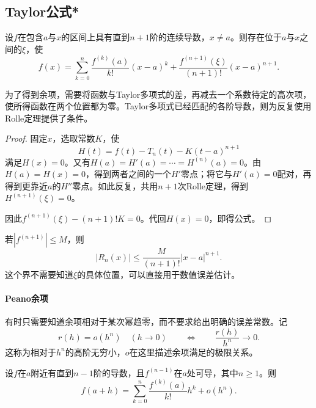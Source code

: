 \subsection{Taylor公式*}

\begin{theorem}[带Lagrange余项的Taylor公式]\label{thm:calculus-taylor-lagrange}
设\(f\)在包含\(a\)与\(x\)的区间上具有直到\(n+1\)阶的连续导数，\(x\ne a\)。则存在位于\(a\)与\(x\)之间的\(\xi\)，使
\begin{equation}\label{eq:calculus-taylor-lagrange}
 f(x)=\sum_{k=0}^n\frac{f^{(k)}(a)}{k!}(x-a)^k
 +\frac{f^{(n+1)}(\xi)}{(n+1)!}(x-a)^{n+1}.
\end{equation}
\end{theorem}

为了得到余项，需要将函数与Taylor多项式的差，再减去一个系数待定的高次项，使所得函数在两个位置都为零。Taylor多项式已经匹配的各阶导数，则为反复使用Rolle定理提供了条件。

\begin{proof}
固定\(x\)，选取常数\(K\)，使
\begin{equation*}
 H(t)=f(t)-T_n(t)-K(t-a)^{n+1}
\end{equation*}
满足\(H(x)=0\)。又有\(H(a)=H'(a)=\cdots=H^{(n)}(a)=0\)。由\(H(a)=H(x)=0\)，得到两者之间的一个\(H'\)零点；将它与\(H'(a)=0\)配对，再得到更靠近\(a\)的\(H''\)零点。如此反复，共用\(n+1\)次Rolle定理，得到\(H^{(n+1)}(\xi)=0\)。

因此\(f^{(n+1)}(\xi)-(n+1)!K=0\)。代回\(H(x)=0\)，即得公式。
\end{proof}

若\(|f^{(n+1)}|\le M\)，则
\begin{equation}\label{eq:calculus-taylor-bound}
 |R_n(x)|\le\frac{M}{(n+1)!}|x-a|^{n+1}.
\end{equation}
这个界不需要知道\(\xi\)的具体位置，可以直接用于数值误差估计。

\paragraph{Peano余项} \mbox{}

有时只需要知道余项相对于某次幂趋零，而不要求给出明确的误差常数。记
\begin{equation*}
 r(h)=o(h^n)\quad(h\to0)
 \qquad\Longleftrightarrow\qquad
 \frac{r(h)}{h^n}\to0.
\end{equation*}
这称为相对于\(h^n\)的高阶无穷小，\(o\)在这里描述余项满足的极限关系。

\begin{theorem}[带Peano余项的Taylor公式]\label{thm:calculus-taylor-peano}
设\(f\)在\(a\)附近有直到\(n-1\)阶的导数，且\(f^{(n-1)}\)在\(a\)处可导，其中\(n\ge1\)。则
\begin{equation}\label{eq:calculus-taylor-peano}
 f(a+h)=\sum_{k=0}^n\frac{f^{(k)}(a)}{k!}h^k+o(h^n).
\end{equation}
\end{theorem}


